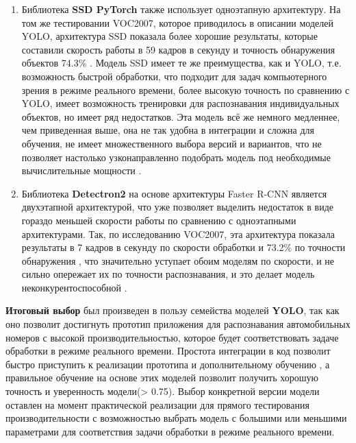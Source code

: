 \documentclass[a4paper,12pt]{article}
\begin{document}
\begin{enumerate}
    Для семейства YOLO можно выделить следующие преимущества: высокая скорость обработки, которая подходит для использования в режиме реального времени, высокая точность распознавания, легкость интеграции, множественный выбор версий модели и дополнительного разделения по используемым ресурсам, возможность легкого дообучения модели на предварительных весах для получения собственной модели распознавания индивидуального объекта \cite{yolo}.
    \item Библиотека \textbf{SSD PyTorch} также использует одноэтапную архитектуру. На том же тестировании VOC2007, которое приводилось в описании моделей YOLO, архитектура SSD показала более хорошие результаты, которые составили скорость работы в 59 кадров в секунду и точность обнаружения объектов 74.3\% \cite{liu}.
    Модель SSD имеет те же преимущества, как и YOLO, т.е. возможность быстрой обработки, что подходит для задач компьютерного зрения в режиме реального времени, более высокую точность по сравнению с YOLO, имеет возможность тренировки для распознавания индивидуальных объектов, но имеет ряд недостатков. Эта модель всё же немного медленнее, чем приведенная выше, она не так удобна в интеграции и сложна для обучения, не имеет множественного выбора версий и вариантов, что не позволяет настолько узконаправленно подобрать модель под необходимые вычислительные мощности \cite{ssd_py}.
    \item Библиотека \textbf{Detectron2} на основе архитектуры Faster R-CNN является двухэтапной архитектурой, что уже позволяет выделить недостаток в виде гораздо меньшей скорости работы по сравнению с одноэтапными архитектурами. Так, по исследованию VOC2007, эта архитектура показала результаты в 7 кадров в секунду по скорости обработки и 73.2\% по точности обнаружения \cite{liu}, что значительно уступает обоим моделям по скорости, и не сильно опережает их по точности распознавания, и это делает модель неконкурентоспособной \cite{detectron}.
\end{enumerate}

\textbf{Итоговый выбор} был произведен в пользу семейства моделей \textbf{YOLO}, так как оно позволит достигнуть прототип приложения для распознавания автомобильных номеров с высокой производительностью, которое будет соответствовать задаче обработки в режиме реального времени. Простота интеграции в код позволит быстро приступить к реализации прототипа и дополнительному обучению , а правильное обучение на основе этих моделей позволит получить хорошую точность и уверенность модели(> 0.75).
Выбор конкретной версии модели оставлен на момент практической реализации для прямого тестирования производительности с возможностью выбрать модель с большими или меньшими параметрами для соответствия задачи обработки в режиме реального времени. 
\end{document}
